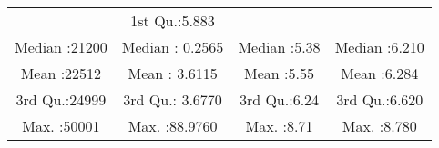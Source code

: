 \documentclass[
]{article}
\begin{document}
\begin{longtable}[]{@{}cccc@{}}
\begin{minipage}[t]{0.18\columnwidth}
\end{minipage} & \begin{minipage}[t]{0.20\columnwidth}\centering
1st Qu.:5.883\strut
\end{minipage}\tabularnewline
\begin{minipage}[t]{0.20\columnwidth}\centering
Median :21200\strut
\end{minipage} & \begin{minipage}[t]{0.23\columnwidth}\centering
Median : 0.2565\strut
\end{minipage} & \begin{minipage}[t]{0.18\columnwidth}\centering
Median :5.38\strut
\end{minipage} & \begin{minipage}[t]{0.20\columnwidth}\centering
Median :6.210\strut
\end{minipage}\tabularnewline
\begin{minipage}[t]{0.20\columnwidth}\centering
Mean :22512\strut
\end{minipage} & \begin{minipage}[t]{0.23\columnwidth}\centering
Mean : 3.6115\strut
\end{minipage} & \begin{minipage}[t]{0.18\columnwidth}\centering
Mean :5.55\strut
\end{minipage} & \begin{minipage}[t]{0.20\columnwidth}\centering
Mean :6.284\strut
\end{minipage}\tabularnewline
\begin{minipage}[t]{0.20\columnwidth}\centering
3rd Qu.:24999\strut
\end{minipage} & \begin{minipage}[t]{0.23\columnwidth}\centering
3rd Qu.: 3.6770\strut
\end{minipage} & \begin{minipage}[t]{0.18\columnwidth}\centering
3rd Qu.:6.24\strut
\end{minipage} & \begin{minipage}[t]{0.20\columnwidth}\centering
3rd Qu.:6.620\strut
\end{minipage}\tabularnewline
\begin{minipage}[t]{0.20\columnwidth}\centering
Max. :50001\strut
\end{minipage} & \begin{minipage}[t]{0.23\columnwidth}\centering
Max. :88.9760\strut
\end{minipage} & \begin{minipage}[t]{0.18\columnwidth}\centering
Max. :8.71\strut
\end{minipage} & \begin{minipage}[t]{0.20\columnwidth}\centering
Max. :8.780\strut
\end{minipage}\tabularnewline
\bottomrule
\end{longtable}
\end{document}
